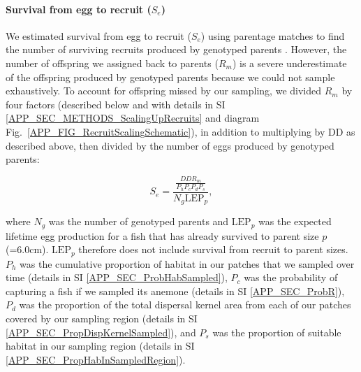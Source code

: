 \documentclass[12pt, oneside]{article}   	%
\begin{document}
\paragraph*{Survival from egg to recruit ($S_e$)}

We estimated survival from egg to recruit ($S_e$) using parentage matches to find the number of surviving recruits produced by genotyped parents \citep[similar to][]{johnson2018integrating}. However, the number of offspring we assigned back to parents ($R_m$) is a severe underestimate of the offspring produced by genotyped parents because we could not sample exhaustively. To account for offspring missed by our sampling, we divided $R_m$ by four factors (described below and with details in SI \ref{APP_SEC_METHODS_ScalingUpRecruits} and diagram Fig.\ \ref{APP_FIG_RecruitScalingSchematic}), in addition to multiplying by $\text{DD}$ as described above, then divided by the number of eggs produced by genotyped parents:

\begin{equation}
S_e = \frac{\frac{DD R_m}{P_h P_c P_d P_s}}{N_g \text{LEP}_p}, \label{EQN_EggRecruitSurv}
\end{equation}

where $N_g$ was the number of genotyped parents and $\text{LEP}_p$ was the expected lifetime egg production for a fish that has already survived to parent size $p$ (=6.0cm). $\text{LEP}_p$ therefore does not include survival from recruit to parent sizes. $P_h$ was the cumulative proportion of habitat in our patches that we sampled over time (details in SI \ref{APP_SEC_ProbHabSampled}), $P_c$ was the probability of capturing a fish if we sampled its anemone (details in SI \ref{APP_SEC_ProbR}), $P_d$ was the proportion of the total dispersal kernel area from each of our patches covered by our sampling region (details in SI \ref{APP_SEC_PropDispKernelSampled}), and $P_s$ was the proportion of suitable habitat in our sampling region (details in SI \ref{APP_SEC_PropHabInSampledRegion}).
\end{document}
